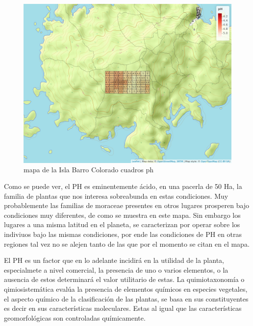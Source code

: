 \documentclass[11pt,]{article}
\begin{document}
\begin{figure}
\centering
\includegraphics[width=1.00000\textwidth]{mapa_cuadros_ph.png}
\caption{mapa de la Isla Barro Colorado cuadros ph\label{fig:bci_map}}
\end{figure}

Como se puede ver, el PH es eminentemente ácido, en una pacerla de 50
Ha, la familia de plantas que nos interesa sobreabunda en estas
condiciones. Muy probablemente las familias de moraceae presentes en
otros lugares prosperen bajo condiciones muy diferentes, de como se
muestra en este mapa. Sin embargo los lugares a una misma latitud en el
planeta, se caracterizan por operar sobre los indiviuos bajo las mismas
condiciones, por ende las condiciones de PH en otras regiones tal vez no
se alejen tanto de las que por el momento se citan en el mapa.

El PH es un factor que en lo adelante incidirá en la utilidad de la
planta, especialmete a nivel comercial, la presencia de uno o varios
elementos, o la ausencia de estos determinará el valor utilitario de
estas. La quimiotaxonomía o qimiosistemática evalúa la presencia de
elementos químicos en especies vegetales, el aspecto químico de la
clasificación de las plantas, se basa en sus constituyentes es decir en
sus características moleculares. Estas al igual que las características
geomorfológicas son controladas químicamente.
\end{document}
